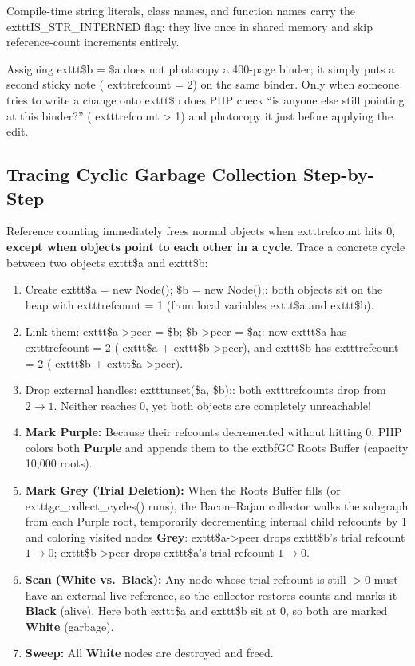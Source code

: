Compile-time string literals, class names, and function names carry the 	exttt{IS\_STR\_INTERNED} flag: they live once in shared memory and skip reference-count increments entirely.

\begin{intuitionbox}
Assigning 	exttt{\$b = \$a} does not photocopy a 400-page binder; it simply puts a second sticky note (	exttt{refcount = 2}) on the same binder. Only when someone tries to write a change onto 	exttt{\$b} does PHP check ``is anyone else still pointing at this binder?'' (	exttt{refcount > 1}) and photocopy it just before applying the edit.
\end{intuitionbox}

\subsection{Tracing Cyclic Garbage Collection Step-by-Step}

Reference counting immediately frees normal objects when 	exttt{refcount} hits 0, \textbf{except when objects point to each other in a cycle}. Trace a concrete cycle between two objects 	exttt{\$a} and 	exttt{\$b}:

\begin{enumerate}[leftmargin=15pt]
  \item Create 	exttt{\$a = new Node(); \$b = new Node();}: both objects sit on the heap with 	exttt{refcount = 1} (from local variables 	exttt{\$a} and 	exttt{\$b}).
  \item Link them: 	exttt{\$a->peer = \$b; \$b->peer = \$a;}: now 	exttt{\$a} has 	exttt{refcount = 2} (	exttt{\$a} + 	exttt{\$b->peer}), and 	exttt{\$b} has 	exttt{refcount = 2} (	exttt{\$b} + 	exttt{\$a->peer}).
  \item Drop external handles: 	exttt{unset(\$a, \$b);}: both 	exttt{refcount}s drop from $2 \to 1$. Neither reaches 0, yet both objects are completely unreachable!
  \item \textbf{Mark Purple:} Because their refcounts decremented without hitting 0, PHP colors both \textbf{Purple} and appends them to the 	extbf{GC Roots Buffer} (capacity 10,000 roots).
  \item \textbf{Mark Grey (Trial Deletion):} When the Roots Buffer fills (or 	exttt{gc\_collect\_cycles()} runs), the Bacon--Rajan collector walks the subgraph from each Purple root, temporarily decrementing internal child refcounts by 1 and coloring visited nodes \textbf{Grey}: 	exttt{\$a->peer} drops 	exttt{\$b}'s trial refcount $1 \to 0$; 	exttt{\$b->peer} drops 	exttt{\$a}'s trial refcount $1 \to 0$.
  \item \textbf{Scan (White vs.\ Black):} Any node whose trial refcount is still $> 0$ must have an external live reference, so the collector restores counts and marks it \textbf{Black} (alive). Here both 	exttt{\$a} and 	exttt{\$b} sit at $0$, so both are marked \textbf{White} (garbage).
  \item \textbf{Sweep:} All \textbf{White} nodes are destroyed and freed.
\end{enumerate}


